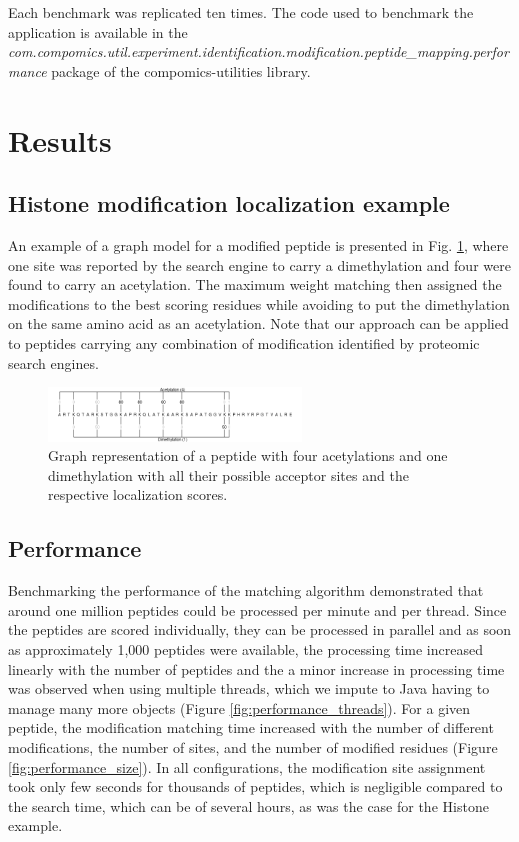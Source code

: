 \documentclass[]{article}
\begin{document}
Each benchmark was replicated ten times. The code used to benchmark the application is available in the \textit{com.compomics.util.experiment.identification.modification.peptide\_mapping.performance} package of the compomics-utilities library.


\section{Results}

\subsection{Histone modification localization example}


 An example of a graph model for a modified peptide is presented in Fig. \ref{fig:histone_peptide}, where one site was reported by the search engine to carry a dimethylation and four were found to carry an acetylation. The maximum weight matching then assigned the modifications to the best scoring residues while avoiding to put the dimethylation on the same amino acid as an acetylation. Note that our approach can be applied to peptides carrying any combination of modification identified by proteomic search engines.
 
 \begin{figure}[!tpb]
 	\centerline{\includegraphics[width=0.6\textwidth]{figures/figure_histone.png}}
 	\caption{Graph representation of a peptide with four acetylations and one dimethylation with all their possible acceptor sites and the respective localization scores.}\label{fig:histone_peptide}
 \end{figure}

 

\subsection{Performance}

Benchmarking the performance of the matching algorithm demonstrated that around one million peptides could be processed per minute and per thread. Since the peptides are scored individually, they can be processed in parallel and as soon as approximately 1,000 peptides were available, the processing time increased linearly with the number of peptides and the a minor increase in processing time was observed when using multiple threads, which we impute to Java having to manage many more objects (Figure \ref{fig:performance_threads}). For a given peptide, the modification matching time increased with the number of different modifications, the number of sites, and the number of modified residues (Figure \ref{fig:performance_size}). In all configurations, the modification site assignment took only few seconds for thousands of peptides, which is negligible compared to the search time, which can be of several hours, as was the case for the Histone example.
\end{document}
